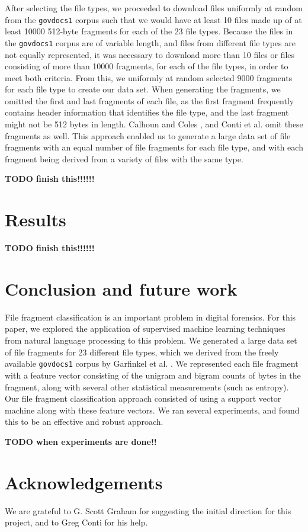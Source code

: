 \documentclass[letter,11pt]{article}
\begin{document}
After selecting the file types, we proceeded to download files uniformly at random from the \texttt{govdocs1} corpus such that we would have at least 10 files made up of at least 10000 512-byte fragments for each of the 23 file types. Because the files in the \texttt{govdocs1} corpus are of variable length, and files from different file types are not equally represented, it was necessary to download more than 10 files or files consisting of more than 10000 fragments, for each of the file types, in order to meet both criteria. From this, we uniformly at random selected 9000 fragments for each file type to create our data set. When generating the fragments, we omitted the first and last fragments of each file, as the first fragment frequently contains header information that identifies the file type, and the last fragment might not be 512 bytes in length. Calhoun and Coles \cite{Calhoun08}, and Conti et al. \cite{Conti10} omit these fragments as well. This approach enabled us to generate a large data set of file fragments with an equal number of file fragments for each file type, and with each fragment being derived from a variety of files with the same type.

\textbf{TODO finish this!!!!!!}

\section{Results}
\label{Section:Results}
\textbf{TODO finish this!!!!!!}

\section{Conclusion and future work}
\label{Section:ConclusionAndFutureWork}
File fragment classification is an important problem in digital forensics. For this paper, we explored the application of supervised machine learning techniques from natural language processing to this problem. We generated a large data set of file fragments for 23 different file types, which we derived from the freely available \texttt{govdocs1} corpus by Garfinkel et al. \cite{Garfinkel09}. We represented each file fragment with a feature vector consisting of the unigram and bigram counts of bytes in the fragment, along with several other statistical measurements (such as entropy). Our file fragment classification approach consisted of using a support vector machine along with these feature vectors. We ran several experiments, and found this to be an effective and robust approach.

\textbf{TODO when experiments are done!!}

\section*{Acknowledgements}
We are grateful to G. Scott Graham for suggesting the initial direction for this project, and to Greg Conti for his help.


\newpage


\end{document}
